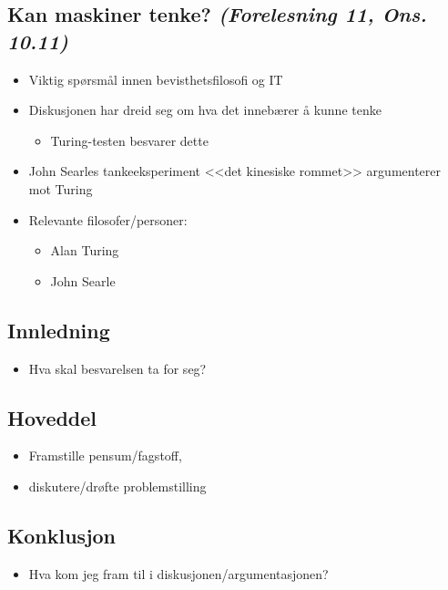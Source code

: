 \subsection*{Kan maskiner tenke? \textnormal{\textit{(Forelesning 11, Ons. 10.11)}}}
\begin{itemize}
    \item Viktig spørsmål innen bevisthetsfilosofi og IT
    \item Diskusjonen har dreid seg om hva det innebærer å kunne tenke
          \begin{itemize}
              \item Turing-testen besvarer dette
          \end{itemize}
    \item John Searles tankeeksperiment <<det kinesiske rommet>> argumenterer \\mot Turing
    \item Relevante filosofer/personer:
          \begin{itemize}
              \item Alan Turing
              \item John Searle
          \end{itemize}
\end{itemize}

\subsection*{Innledning}
\begin{itemize}
    \item Hva skal besvarelsen ta for seg? 
\end{itemize}

\subsection*{Hoveddel}
\begin{itemize}
    \item Framstille pensum/fagstoff, 
    \item diskutere/drøfte problemstilling
\end{itemize}


\subsection*{Konklusjon}
\begin{itemize}
    \item Hva kom jeg fram til i diskusjonen/argumentasjonen?
\end{itemize}
